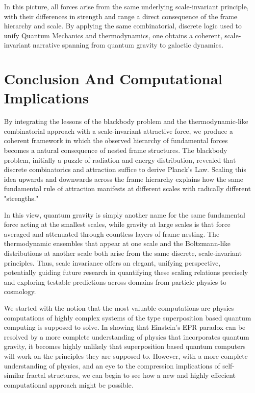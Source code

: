 \documentclass{report}
\begin{document}
In this picture, all forces arise from the same underlying scale-invariant principle, with their differences in strength and range a direct consequence of the frame hierarchy and scale. By applying the same combinatorial, discrete logic used to unify Quantum Mechanics and thermodynamics, one obtains a coherent, scale-invariant narrative spanning from quantum gravity to galactic dynamics.

\section*{Conclusion And Computational Implications}

By integrating the lessons of the blackbody problem and the thermodynamic-like combinatorial approach with a scale-invariant attractive force, we produce a coherent framework in which the observed hierarchy of fundamental forces becomes a natural consequence of nested frame structures. The blackbody problem, initially a puzzle of radiation and energy distribution, revealed that discrete combinatorics and attraction suffice to derive Planck’s Law. Scaling this idea upwards and downwards across the frame hierarchy explains how the same fundamental rule of attraction manifests at different scales with radically different "strengths."

In this view, quantum gravity is simply another name for the same fundamental force acting at the smallest scales, while gravity at large scales is that force averaged and attenuated through countless layers of frame nesting. The thermodynamic ensembles that appear at one scale and the Boltzmann-like distributions at another scale both arise from the same discrete, scale-invariant principles. Thus, scale invariance offers an elegant, unifying perspective, potentially guiding future research in quantifying these scaling relations precisely and exploring testable predictions across domains from particle physics to cosmology.

We started with the notion that the most valuable computations are physics computations of highly complex systems of the type superposition based quantum computing is supposed to solve. In showing that Einstein's EPR paradox can be resolved by a more complete understanding of physics that incorporates quantum gravity, it becomes highly unlikely that superposition based quantum computers will work on the principles they are supposed to. However, with a more complete understanding of physics, and an eye to the compression implications of self-similar fractal structures, we can begin to see how a new and highly effecient computational approach might be possible.
\newpage



\end{document}
